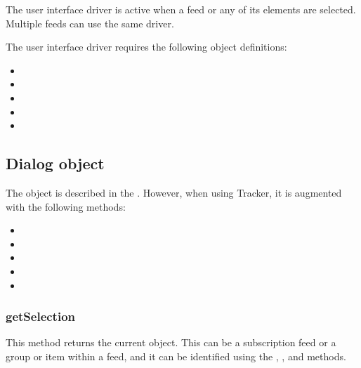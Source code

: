 \documentclass[letterpaper,12pt,english,openany,oneside]{sphinxmanual}
\begin{document}
The user interface driver is active when a feed or any of its elements are selected. Multiple feeds can use the same driver.

The user interface driver requires the following object definitions:
\begin{itemize}
\item {} 

\item {} 

\item {} 

\item {} 

\item {} 

\end{itemize}




\subsection{Dialog object}
\label{\detokenize{Tracker_InboxAPI:dialog-object}}
The  object is described in the  . However, when using Tracker, it is augmented with the following methods:
\begin{itemize}
\item {} 

\item {} 

\item {} 

\item {} 

\item {} 

\end{itemize}




\subsubsection{getSelection}
\label{\detokenize{Tracker_InboxAPI:getselection}}
This method returns the current  object. This can be a subscription feed or a group or item within a feed, and it can be identified using the , , and  methods.
\end{document}
